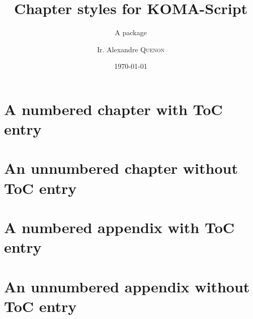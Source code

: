 \documentclass[%
	paper=portrait, paper=A4,%
	fontsize=11pt,%
	oneside%
]{scrbook}
\title{Chapter styles for KOMA-Script}
\subtitle{A package}
\author{Ir. Alexandre \textsc{Quenon}}
\date{\today}
\begin{document}
\maketitle


\frontmatter

	\tableofcontents


\mainmatter

	\chapter{A numbered chapter with ToC entry}
		\lipsum[1-13]
		\lipsum[1-13]
	\chapter*{An unnumbered chapter without ToC entry}
		\lipsum[1-13]


\appendix

	\chapter{A numbered appendix with ToC entry}
		\lipsum[1-13]
		\lipsum[1-13]
	\chapter*{An unnumbered appendix without ToC entry}
		\lipsum[1-13]



\backmatter

\end{document}
